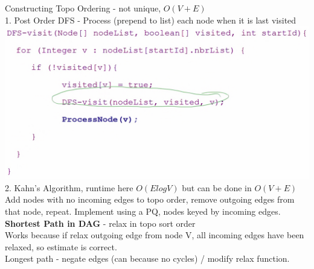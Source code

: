 \documentclass[10pt, a4paper]{article}
\begin{document}
\begin{multicols*}{3}
		Constructing Topo Ordering - not unique, $O(V + E)$\\
		1. Post Order DFS - Process (prepend to list) each node when it is last visited\\
		\includegraphics[scale=.12]{DAG}\\
		2. Kahn's Algorithm, runtime here $O(ElogV)$ but can be done in $O(V + E)$\\
		Add nodes with no incoming edges to topo order, remove outgoing edges from that node, repeat. 
		Implement using a PQ, nodes keyed by incoming edges.\\
		\textbf{Shortest Path in DAG} - relax in topo sort order\\
		Works because if relax outgoing edge from node V, all incoming edges have been relaxed, so estimate is correct.\\
		Longest path - negate edges (can because no cycles) / modify relax function.\\
		

\end{multicols*}
\end{document}
